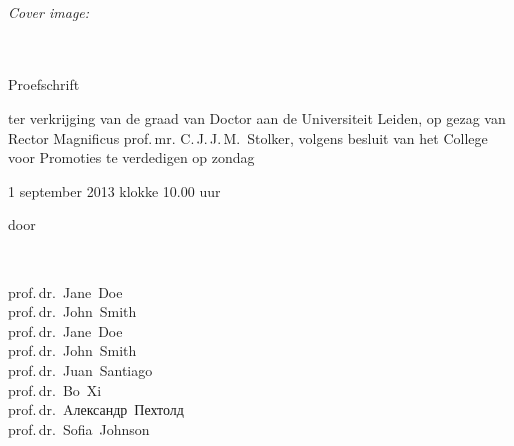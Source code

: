 \thesisprintdetails\\

\emph{Cover image:} \thesiscoverimgdesc\\
\clearpage


\begin{center}
  {
    {\Huge \thesistitle }\\[1em]
    {\huge \thesissubtitle }\\[5em]
    {\Large Proefschrift}\\[5em]
    {\Large \parbox{0.65 \textwidth}{ter verkrijging van de graad van Doctor aan de Universiteit Leiden, op gezag van Rector Magnificus prof.\,mr. C.\,J.\,J.\,M.\ Stolker,
volgens besluit van het College voor Promoties
te verdedigen op zondag \linebreak\centerline{1 september 2013 klokke 10.00 uur}}}\vfill
	{\Large door}\\[3em]
	{\parbox[c][][c]{0.65 \textwidth}{\centering\Large\thesisauthor\\ \thesisauthorborn}}
  }
\end{center}

\clearpage

{\large{}\hspace{3.5cm} prof.\,dr.~Jane~Doe\\
\hspace*{3.5cm} prof.\,dr.~John~Smith}\\[1cm]
{\large{}\hspace{3.5cm} prof.\,dr.~Jane~Doe\\
\hspace*{3.5cm} prof.\,dr.~John~Smith\\
\hspace*{3.5cm} prof.\,dr.~Juan~Santiago\\
\hspace*{3.5cm} prof.\,dr.~Bo~Xi\\
\hspace*{3.5cm} prof.\,dr.~Aлександр~Пехтолд\\
\hspace*{3.5cm} prof.\,dr.~Sofia~Johnson\\
}\\[1cm]
\vfill

